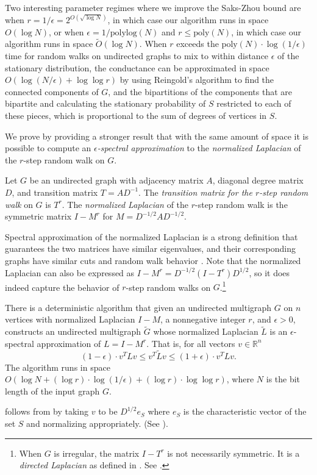 \documentclass{toc}
\newcommand{\wt}{\widetilde}   %
\newcommand{\SC}{O(\log N + (\log r)\cdot\log(1/\epsilon)+(\log r)\cdot \log\log r)}
\numberwithin{myalgctr}{section}
\theoremstyle{named}
\begin{document}
Two interesting parameter regimes where we improve the Saks-Zhou bound are when $r=1/\epsilon=2^{O(\sqrt{\log N})}$, in which case our algorithm runs in space $O(\log N)$, or when $\epsilon=1/\mathrm{polylog}(N)$ and $r\leq \mathrm{poly}(N)$, in which case our algorithm runs in space $\wt{O}(\log N)$. When $r$ exceeds the $\mathrm{poly}(N)\cdot\log(1/\epsilon)$ time for random walks on undirected graphs to mix to within distance $\epsilon$ of the stationary distribution, the conductance can be approximated in space $O(\log (N/\epsilon)+\log\log r)$ by using Reingold's algorithm to find the connected components of $G$, and the bipartitions of the components that are bipartite and calculating the stationary probability of $S$ restricted to each of these pieces, which is proportional to the sum of degrees of vertices in $S$.  


We prove  by providing a stronger result that with the same amount of space it is possible to compute an \emph{$\epsilon$-spectral approximation} to the \emph{normalized Laplacian} of the $r$-step random walk on $G$. 
\begin{definition}
Let $G$ be an undirected graph with adjacency matrix $A$, diagonal degree matrix $D$, and transition matrix $T=AD^{-1}$. The \emph{transition matrix for the $r$-step random walk} on $G$ is $T^r$. The \emph{normalized Laplacian} of the $r$-step random walk is the symmetric matrix $I-M^r$ for $M=D^{-1/2}AD^{-1/2}$. 
\end{definition}
Spectral approximation of the normalized Laplacian is a strong definition that guarantees the two matrices have similar eigenvalues, and their corresponding graphs have similar cuts and random walk behavior \cite{ST11,batson2013spectral}. Note that the normalized Laplacian can also be expressed as
$I-M^r = D^{-1/2}(I-T^r)D^{1/2}$, so it does indeed capture the behavior of $r$-step random walks on $G$.\footnote{When $G$ is irregular, the matrix $I-T^r$ is not necessarily symmetric. It is a \emph{directed Laplacian} as defined in \cite{CKPPSV16, CKPPRSV16}. See .} 

\begin{theorem}
\label{thm:main}
There is a deterministic algorithm that given an undirected multigraph $G$ on $n$ vertices with normalized Laplacian $I-M$, a nonnegative integer $r$, and $\epsilon>0$, constructs an undirected multigraph $\wt{G}$ whose normalized Laplacian $\wt{L}$ is an $\epsilon$-spectral approximation of $L=I-M^r$. That is, for all vectors $v\in\mathbb{R}^n$
\[
(1-\epsilon)\cdot v^{T}Lv \leq v^{T}\wt{L}v \leq (1+\epsilon)\cdot v^{T}Lv.
\]
The algorithm runs in space $\SC$, where $N$ is the bit length of the input graph $G$. 
\end{theorem}
 follows from  by taking $v$ to be $D^{1/2}e_S$ where $e_S$ is the characteristic vector of the set $S$ and normalizing appropriately. (See ).
%
\end{document}
